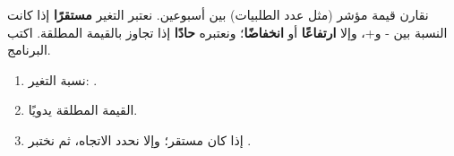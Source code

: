 \begin{statement}
نقارن قيمة مؤشر (مثل عدد الطلبيات) بين أسبوعين. نعتبر التغير \textbf{مستقرًا} إذا كانت النسبة بين - و+، وإلا \textbf{ارتفاعًا} أو \textbf{انخفاضًا}؛ ونعتبره \textbf{حادًا} إذا تجاوز  بالقيمة المطلقة. اكتب البرنامج.
\end{statement}
\begin{stepsbox}\begin{enumerate}
\item نسبة التغير: .
\item القيمة المطلقة  يدويًا.
\item إذا كان  مستقر؛ وإلا نحدد الاتجاه، ثم نختبر .
\end{enumerate}\end{stepsbox}

